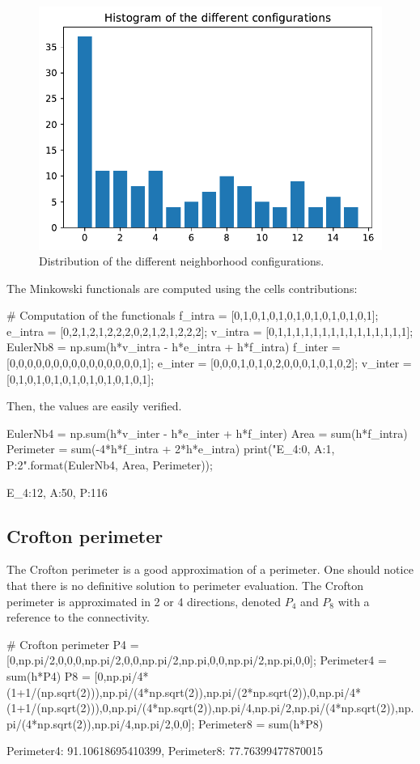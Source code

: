 \begin{figure}[htbp]
\centering
\includegraphics[width=.5\textwidth]{histo.pdf}
\caption{Distribution of the different neighborhood configurations.}
\label{fig:integral_geometry:python:histo}
\end{figure}

The Minkowski functionals are computed using the cells contributions:
\begin{python}
# Computation of the functionals
f_intra = [0,1,0,1,0,1,0,1,0,1,0,1,0,1,0,1];
e_intra = [0,2,1,2,1,2,2,2,0,2,1,2,1,2,2,2];
v_intra = [0,1,1,1,1,1,1,1,1,1,1,1,1,1,1,1];
EulerNb8 = np.sum(h*v_intra - h*e_intra + h*f_intra)
f_inter = [0,0,0,0,0,0,0,0,0,0,0,0,0,0,0,1];
e_inter = [0,0,0,1,0,1,0,2,0,0,0,1,0,1,0,2];
v_inter = [0,1,0,1,0,1,0,1,0,1,0,1,0,1,0,1];
\end{python}

Then, the values are easily verified.
\begin{python}
EulerNb4 = np.sum(h*v_inter - h*e_inter + h*f_inter)
Area = sum(h*f_intra)
Perimeter = sum(-4*h*f_intra + 2*h*e_intra)
print("E_4:{0}, A:{1}, P:{2}".format(EulerNb4, Area, Perimeter));
\end{python}

\begin{sh}
E_4:12, A:50, P:116
\end{sh}


\subsection{Crofton perimeter}
The Crofton perimeter is a good approximation of a perimeter. One should notice that there is no definitive solution to perimeter evaluation. The Crofton perimeter is approximated in 2 or 4 directions, denoted $P_4$ and $P_8$ with a reference to the connectivity.

\begin{python}
# Crofton perimeter
P4 = [0,np.pi/2,0,0,0,np.pi/2,0,0,np.pi/2,np.pi,0,0,np.pi/2,np.pi,0,0];
Perimeter4 = sum(h*P4)
P8 = [0,np.pi/4*(1+1/(np.sqrt(2))),np.pi/(4*np.sqrt(2)),np.pi/(2*np.sqrt(2)),0,np.pi/4*(1+1/(np.sqrt(2))),0,np.pi/(4*np.sqrt(2)),np.pi/4,np.pi/2,np.pi/(4*np.sqrt(2)),np.pi/(4*np.sqrt(2)),np.pi/4,np.pi/2,0,0];
Perimeter8 = sum(h*P8)
\end{python}

\begin{sh}
Perimeter4: 91.10618695410399, Perimeter8: 77.76399477870015
\end{sh}
